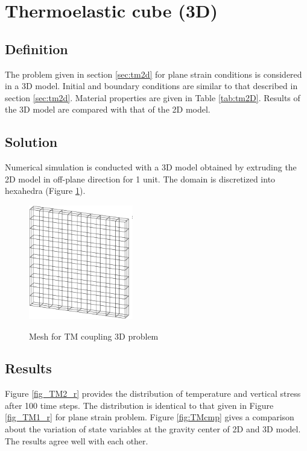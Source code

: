 \section{Thermoelastic cube (3D)}
\subsection{Definition}
The problem given in section \ref{sec:tm2d} for plane strain conditions is considered in a 3D model. 
Initial and boundary conditions are similar to that described in section \ref{sec:tm2d}.
Material properties are given in Table \ref{tab:tm2D}. 
Results of the 3D model are compared with that of the 2D model.

\subsection{Solution}
Numerical simulation is conducted with a 3D model obtained by extruding the 2D model in off-plane direction for 1 unit.
The domain is discretized into hexahedra (Figure \ref{fig:TM3Mesh}).

\begin{figure}[!htb]
\centering
\includegraphics[height=5cm]{PART_III/TM/figures/3D_mesh}\\
\caption{Mesh for TM coupling 3D problem }
\label{fig:TM3Mesh}
\end{figure}



\subsection{Results}
Figure \ref{fig_TM2_r} provides the distribution of temperature and vertical stress after 100 time steps.
The distribution is identical to that given in Figure \ref{fig_TM1_r} for plane strain problem.
Figure \ref{fig:TMcmp} gives a comparison about the variation of state variables at the gravity center of 2D and 3D model.
 The results agree well with each other.

